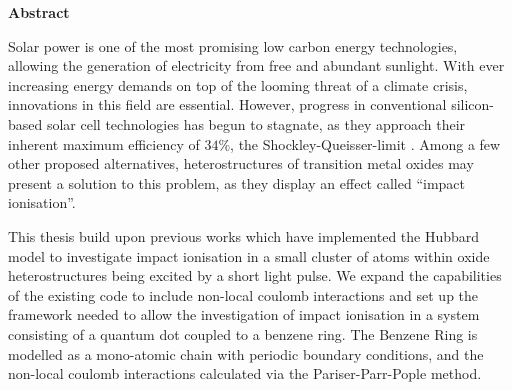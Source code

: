 \def\changemargin#1#2{\list{}{\rightmargin#2\leftmargin#1}\item[]}
\let\endchangemargin=\endlist 

{\small\begin{center}%
\bfseries{Abstract}
\end{center}}

\begin{changemargin}{1cm}{1cm}

Solar power is one of the most promising low carbon energy technologies, allowing the generation of electricity from free and abundant sunlight. With ever increasing energy demands on top of the looming threat of a climate crisis, innovations in this field are essential. However, progress in conventional silicon-based solar cell technologies has begun to stagnate, as they approach their inherent maximum efficiency of $34\%$, the Shockley-Queisser-limit \cite{shockley_queisser}. Among a few other proposed alternatives, heterostructures of transition metal oxides may present a solution to this problem, as they display an effect called ``impact ionisation''.

\smallskip

This thesis build upon previous works \cite{innerberger, worm_bachelor, prauhart, worm_project} which have implemented the Hubbard model to investigate impact ionisation in a small cluster of atoms within oxide heterostructures being excited by a short light pulse. We expand the capabilities of the existing code to include non-local coulomb interactions and set up the framework needed to allow the investigation of impact ionisation in a system consisting of a quantum dot coupled to a benzene ring. The Benzene Ring is modelled as a mono-atomic chain with periodic boundary conditions, and the non-local coulomb interactions calculated via the Pariser-Parr-Pople method.
\end{changemargin}